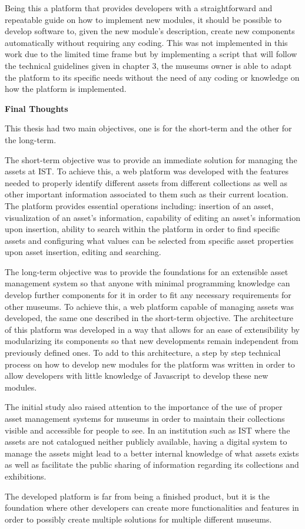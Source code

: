 Being this a platform that provides developers with a straightforward and repeatable guide on how to implement new modules, it should be possible to develop software to, given the new module's description, create new components automatically without requiring any coding. This was not implemented in this work due to the limited time frame but by implementing a script that will follow the technical guidelines given in chapter 3, the museums owner is able to adapt the platform to its specific needs without the need of any coding or knowledge on how the platform is implemented.

\vspace{4mm}
\textbf{Final Thoughts}
\vspace{2mm}

This thesis had two main objectives, one is for the short-term and the other for the long-term.

The short-term objective was to provide an immediate solution for managing the assets at IST. To achieve this, a web platform was developed with the features needed to properly identify different assets from different collections as well as other important information associated to them such as their current location. The platform provides essential operations including: insertion of an asset, visualization of an asset's information, capability of editing an asset's information upon insertion, ability to search within the platform in order to find specific assets and configuring what values can be selected from specific asset properties upon asset insertion, editing and searching.

The long-term objective was to provide the foundations for an extensible asset management system so that anyone with minimal programming knowledge can develop further components for it in order to fit any necessary requirements for other museums. To achieve this, a web platform capable of managing assets was developed, the same one described in the short-term objective. The architecture of this platform was developed in a way that allows for an ease of extensibility by modularizing its components so that new developments remain independent from previously defined ones. To add to this architecture, a step by step technical process on how to develop new modules for the platform was written in order to allow developers with little knowledge of Javascript to develop these new modules.

The initial study also raised attention to the importance of the use of proper asset management systems for museums in order to maintain their collections visible and accessible for people to see. In an institution such as IST where the assets are not catalogued neither publicly available, having a digital system to manage the assets might lead to a better internal knowledge of what assets exists as well as facilitate the public sharing of information regarding its collections and exhibitions.

The developed platform is far from being a finished product, but it is the foundation where other developers can create more functionalities and features in order to possibly create multiple solutions for multiple different museums.